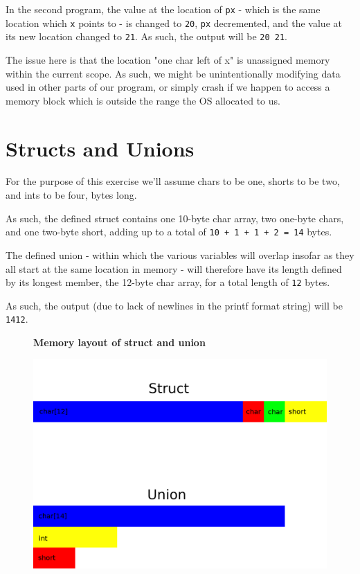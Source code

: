 \documentclass[a4paper]{scrartcl}
\begin{document}
In the second program, the value at the location of \texttt{px} - which is the
same location which \texttt{x} points to - is changed to \texttt{20},
\texttt{px} decremented, and the value at its new location changed to
\texttt{21}. As such, the output will be \texttt{20 21}.

The issue here is that the location "one char left of x" is unassigned memory
within the current scope. As such, we might be unintentionally modifying data
used in other parts of our program, or simply crash if we happen to access a
memory block which is outside the range the OS allocated to us.


\section{Structs and Unions}

For the purpose of this exercise we'll assume chars to be one, shorts to be
two, and ints to be four, bytes long.

As such, the defined struct contains one 10-byte char array, two one-byte
chars, and one two-byte short, adding up to a total of \texttt{10 + 1 + 1 + 2 =
14} bytes.

The defined union - within which the various variables will overlap insofar as they
all start at the same location in memory - will therefore have its length defined by its
longest member, the 12-byte char array, for a total length of \texttt{12}
bytes.

As such, the output (due to lack of newlines in the printf format string) will be \texttt{1412}.

\begin{figure}
	\centering
	\textbf{Memory layout of struct and union}\par\medskip
	\includegraphics[width=\textwidth]{resources/memory_layout.png}
\end{figure}
\end{document}

